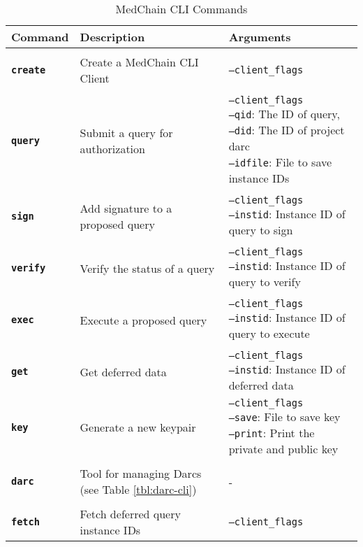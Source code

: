 \begin{table}[ht]
\centering
\caption{MedChain CLI Commands}
\label{tbl:cli}
\begin{tabular}{|l|l|l|}
\hline
\textbf{Command} & \textbf{Description} & \textbf{Arguments}\\
\hline
\\[-1em]
\textbf{\texttt{create}}    &  Create a MedChain CLI Client & \pbox{20cm}{ \texttt{--client\_flags}\\[1pt]} \\ 
\hline
\\[-1em]
\textbf{\texttt{query}} & Submit a query for authorization  &  \pbox{20cm}{ \texttt{--client\_flags} \\ \texttt{--qid}: The ID of query, \\ \texttt{--did}: The ID of project darc \\ \texttt{--idfile}: File to save instance IDs \\[1pt]} \\
\hline
\\[-1em]
\textbf{\texttt{sign}} & Add signature to a proposed query  & \pbox{20cm}{ \texttt{--client\_flags} \\ \texttt{--instid}: Instance ID of query to sign \\[1pt]} \\
\hline
\\[-1em]
\textbf{\texttt{verify}} & Verify the status of a query  & \pbox{20cm}{ \texttt{--client\_flags} \\ \texttt{--instid}: Instance ID of query to verify \\[1pt]}\\
\hline
\\[-1em]
\textbf{\texttt{exec}} & Execute a proposed query  &\pbox{20cm}{ \texttt{--client\_flags} \\ \texttt{--instid}: Instance ID of query to execute  \\[1pt]}  \\
\hline
\\[-1em]
\textbf{\texttt{get}} & Get deferred data  & \pbox{20cm}{ \texttt{--client\_flags} \\ \texttt{--instid}: Instance ID of deferred data \\[1pt]} \\
\hline
 \textbf{\texttt{key}} & Generate a new keypair & \pbox{20cm}{ \texttt{--client\_flags} \\ \texttt{--save}: File to save key \\ \texttt{--print}: Print the private and public key  \\[1pt]} \\
\hline
\\[-1em]
\textbf{\texttt{darc}} & Tool for managing Darcs (see Table \ref{tbl:darc-cli}) & \pbox{20cm}{ - \\[1pt]}  \\
\hline
\\[-1em]
\textbf{\texttt{fetch}} & Fetch deferred query instance IDs & \pbox{20cm}{ \texttt{--client\_flags}\\[1pt]} \\
\hline
\end{tabular}
\end{table}


